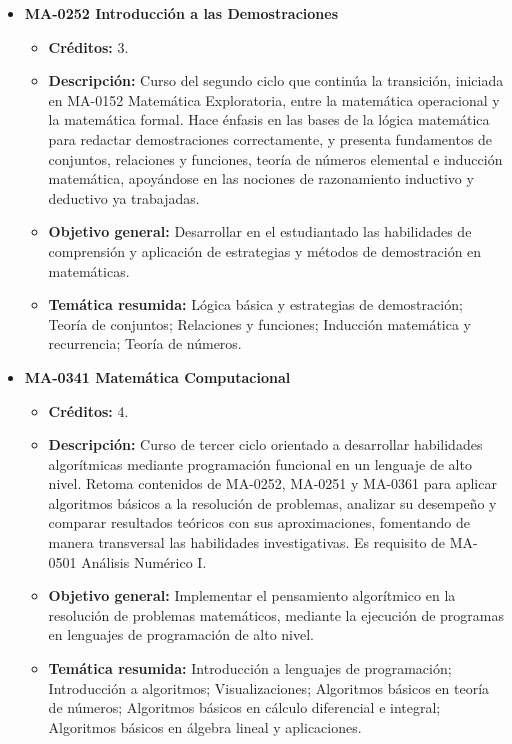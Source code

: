 \begin{itemize}[leftmargin=1.3em, itemsep=10pt, topsep=4pt, label={\color{Azul-UCR}$\blacksquare$}]
\item {\color{Azul-UCR}\textbf{MA-0252 Introducción a las Demostraciones}}\par\nopagebreak\smallskip
\begin{itemize}[leftmargin=1.1em, itemsep=3pt, topsep=2pt, parsep=2pt, label={\textendash}]
\item \textbf{Créditos:} 3.
\item \textbf{Descripción:} Curso del segundo ciclo que continúa la transición, iniciada en MA-0152 Matemática Exploratoria, entre la matemática operacional y la matemática formal. Hace énfasis en las bases de la lógica matemática para redactar demostraciones correctamente, y presenta fundamentos de conjuntos, relaciones y funciones, teoría de números elemental e inducción matemática, apoyándose en las nociones de razonamiento inductivo y deductivo ya trabajadas.
\item \textbf{Objetivo general:} Desarrollar en el estudiantado las habilidades de comprensión y aplicación de estrategias y métodos de demostración en matemáticas.
\item \textbf{Temática resumida:} Lógica básica y estrategias de demostración; Teoría de conjuntos; Relaciones y funciones; Inducción matemática y recurrencia; Teoría de números.
\end{itemize}

\item {\color{Azul-UCR}\textbf{MA-0341 Matemática Computacional}}\par\nopagebreak\smallskip
\begin{itemize}[leftmargin=1.1em, itemsep=3pt, topsep=2pt, parsep=2pt, label={\textendash}]
\item \textbf{Créditos:} 4.
\item \textbf{Descripción:} Curso de tercer ciclo orientado a desarrollar habilidades algorítmicas mediante programación funcional en un lenguaje de alto nivel. Retoma contenidos de MA-0252, MA-0251 y MA-0361 para aplicar algoritmos básicos a la resolución de problemas, analizar su desempeño y comparar resultados teóricos con sus aproximaciones, fomentando de manera transversal las habilidades investigativas. Es requisito de MA-0501 Análisis Numérico I.
\item \textbf{Objetivo general:} Implementar el pensamiento algorítmico en la resolución de problemas matemáticos, mediante la ejecución de programas en lenguajes de programación de alto nivel.
\item \textbf{Temática resumida:} Introducción a lenguajes de programación; Introducción a algoritmos; Visualizaciones; Algoritmos básicos en teoría de números; Algoritmos básicos en cálculo diferencial e integral; Algoritmos básicos en álgebra lineal y aplicaciones.
\end{itemize}


\end{itemize}
